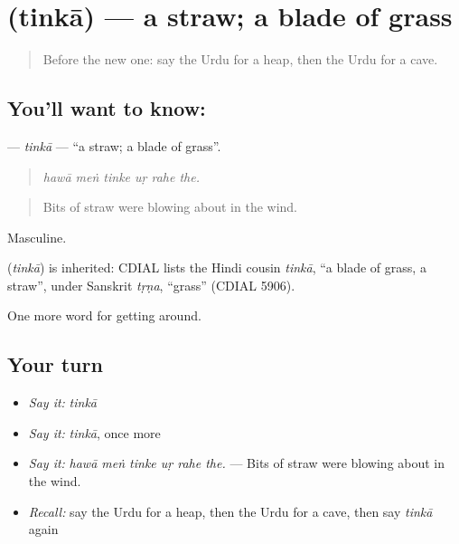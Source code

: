 \section[\texorpdfstring{\ur{تنکا} (tinkā)}{تنکا (tinkā)}]{ (tinkā) — a straw; a blade of grass}

\label{lesson:UR-C433-tinka}



\begin{quote}
Before the new one: say the Urdu for a heap, then the Urdu for a cave.
\end{quote}

\subsection*{You'll want to know: }
\textbf{} — \emph{tinkā} — \textquotedblleft{}a straw; a blade of grass\textquotedblright{}.

\begin{quote}
     
\end{quote}

\begin{quote}
\emph{hawā meṅ tinke uṛ rahe the.}
\end{quote}

\begin{quote}
Bits of straw were blowing about in the wind.
\end{quote}

Masculine.

\begin{cousinweb}
\textbf{} (\emph{tinkā}) is inherited: CDIAL lists the Hindi cousin \emph{tinkā}, \textquotedblleft{}a blade of grass, a straw\textquotedblright{}, under Sanskrit \emph{tṛṇa}, \textquotedblleft{}grass\textquotedblright{} (CDIAL 5906).
\end{cousinweb}

\begin{grammarlens}[title={What you've built}]
One more word for getting around.
\end{grammarlens}

\subsection*{Your turn}
\begin{itemize}
\raggedright
  \item \emph{Say it:} \emph{tinkā}
  \item \emph{Say it:} \emph{tinkā}, once more
  \item \emph{Say it:} \emph{hawā meṅ tinke uṛ rahe the.} — Bits of straw were blowing about in the wind.
  \item \emph{Recall:} say the Urdu for a heap, then the Urdu for a cave, then say \emph{tinkā} again
\end{itemize}

